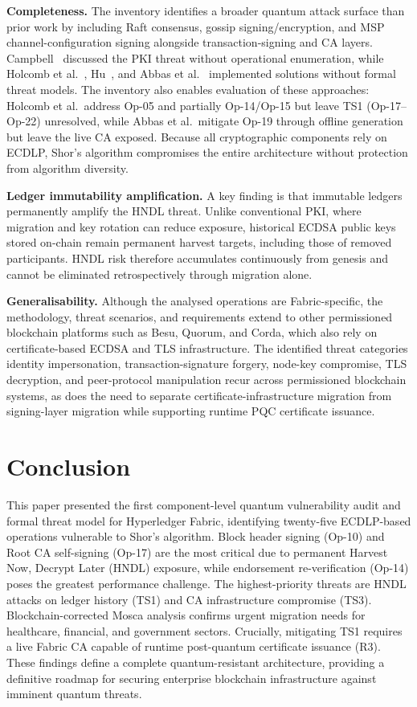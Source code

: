 \documentclass[conference]{IEEEtran}
\begin{document}
\textbf{Completeness.} The inventory identifies a broader quantum attack surface than prior work by including Raft consensus, gossip signing/encryption, and MSP channel-configuration signing alongside transaction-signing and CA layers. Campbell~\cite{campbell2019} discussed the PKI threat without operational enumeration, while Holcomb et al.~\cite{holcomb2021}, Hu~\cite{hu2025prototype}, and Abbas et al.~\cite{abbas2025} implemented solutions without formal threat models. The inventory also enables evaluation of these approaches: Holcomb et al.\ address Op-05 and partially Op-14/Op-15 but leave TS1 (Op-17--Op-22) unresolved, while Abbas et al.\ mitigate Op-19 through offline generation but leave the live CA exposed. Because all cryptographic components rely on ECDLP, Shor’s algorithm compromises the entire architecture without protection from algorithm diversity.

\textbf{Ledger immutability amplification.} A key finding is that immutable ledgers permanently amplify the HNDL threat. Unlike conventional PKI, where migration and key rotation can reduce exposure, historical ECDSA public keys stored on-chain remain permanent harvest targets, including those of removed participants. HNDL risk therefore accumulates continuously from genesis and cannot be eliminated retrospectively through migration alone.

\textbf{Generalisability.} Although the analysed operations are Fabric-specific, the methodology, threat scenarios, and requirements extend to other permissioned blockchain platforms such as Besu, Quorum, and Corda, which also rely on certificate-based ECDSA and TLS infrastructure. The identified threat categories identity impersonation, transaction-signature forgery, node-key compromise, TLS decryption, and peer-protocol manipulation recur across permissioned blockchain systems, as does the need to separate certificate-infrastructure migration from signing-layer migration while supporting runtime PQC certificate issuance.


\section{Conclusion}
\label{sec:tm_conclusion}
This paper presented the first component-level quantum vulnerability audit and formal threat model for Hyperledger Fabric, identifying twenty-five ECDLP-based operations vulnerable to Shor’s algorithm. Block header signing (Op-10) and Root CA self-signing (Op-17) are the most critical due to permanent Harvest Now, Decrypt Later (HNDL) exposure, while endorsement re-verification (Op-14) poses the greatest performance challenge. The highest-priority threats are HNDL attacks on ledger history (TS1) and CA infrastructure compromise (TS3). Blockchain-corrected Mosca analysis confirms urgent migration needs for healthcare, financial, and government sectors. Crucially, mitigating TS1 requires a live Fabric CA capable of runtime post-quantum certificate issuance (R3). These findings define a complete quantum-resistant architecture, providing a definitive roadmap for securing enterprise blockchain infrastructure against imminent quantum threats.



\end{document}
